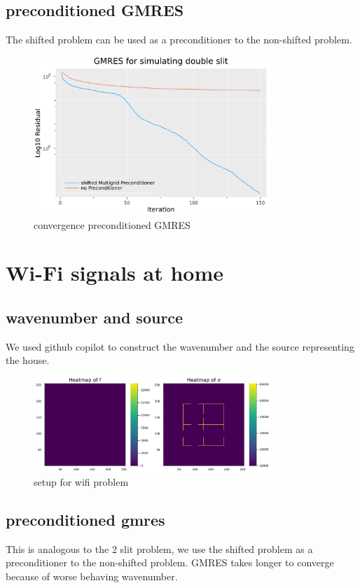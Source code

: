 \documentclass[a4paper,12pt]{article}
\begin{document}
\subsection{preconditioned GMRES}
The shifted problem can be used as a preconditioner to the non-shifted problem.
\begin{figure}[h!]
    \centering
    \includegraphics[width=0.8\textwidth]{../plots/GMRES2slit.pdf}
    \caption{convergence preconditioned GMRES}
    \label{fig:../plots/GMRES2slit.pdf}
\end{figure}

\section{Wi-Fi signals at home}

\subsection{wavenumber and source}
We used github copilot to construct the wavenumber and the source representing the house.

\begin{figure}[h!]
    \centering
    \includegraphics[width=0.8\textwidth]{../plots/wifi_setup.pdf}
    \caption{setup for wifi problem}
    \label{fig:../plots/wifi_setup.pdf}
\end{figure}

\subsection{preconditioned gmres}
This is analogous to the 2 slit problem, we use the shifted problem as a preconditioner to the non-shifted problem.
GMRES takes longer to converge because of worse behaving wavenumber.
\end{document}
